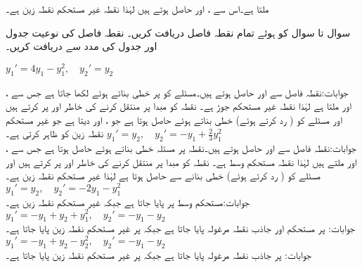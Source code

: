 ملتا ہے۔اس سے ،  اور  حاصل ہوتے ہیں لہٰذا نقطہ  غیر مستحکم نقطہ زین ہے۔

سوال  تا سوال  کو  ہوئے تمام نقطہ فاصل دریافت کریں۔ نقطہ فاصل کی نوعیت جدول  اور جدول  کی مدد سے دریافت کریں۔

\quad 
$y_1'=4y_1-y_1^2,\quad y_2'=y_2$

جوابات:نقطہ فاصل  سے  اور  حاصل ہوتے ہیں۔مسئلے کو  پر خطی بناتے ہوئے  لکھا جاتا ہے جس سے ،  اور  ملتا ہے لہٰذا نقطہ  غیر مستحکم جوڑ ہے۔ نقطہ  کو مبدا پر منتقل کرنے کی خاطر  اور  پر کرتے ہیں اور مسئلے کو ( رد کرتے ہوئے) خطی بناتے ہوئے  حاصل ہوتا ہے جو ،  اور  دیتا ہے  جو غیر مستحکم نقطہ زین کو ظاہر کرتی ہے۔
\quad 
$y_1'=y_2,\quad y_2'=-y_1+\frac{2}{3}y_1^2$\\
جوابات:نقطہ فاصل  سے  اور  حاصل ہوتے ہیں۔نقطہ  پر مسئلہ خطی بناتے ہوئے  حاصل ہوتا ہے جس سے ،  اور  ملتے ہیں لہٰذا نقطہ  مستحکم وسط ہے۔ نقطہ  کو مبدا پر منتقل کرنے کی خاطر  اور  پر کرتے ہیں اور  مسئلے کو ( رد کرتے ہوئے) خطی بنانے سے   حاصل ہوتا ہے لہٰذا  غیر مستحکم نقطہ زین ہے۔
\quad 
$y_1'=y_2,\quad y_2'=-2y_1-y_1^2$\\
جوابات:مستحکم وسط  پر پایا جاتا ہے جبکہ  غیر مستحکم نقطہ زین  ہے۔
\quad 
$y_1'=-y_1+y_2+y_1^2,\quad y_2'=-y_1-y_2$\\
جوابات: پر مستحکم اور جاذب نقطہ مرغولہ پایا جاتا ہے جبکہ  پر غیر مستحکم نقطہ زین پایا جاتا ہے۔
\quad 
$y_1'=-y_1+y_2-y_2^2,\quad y_2'=-y_1-y_2$\\
جوابات: پر جاذب  نقطہ مرغولہ  پایا جاتا ہے جبکہ  پر غیر مستحکم نقطہ زین پایا جاتا ہے۔

